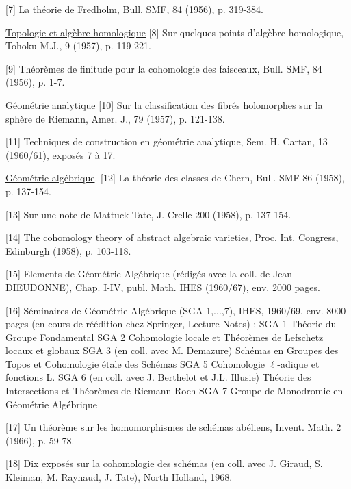 \documentclass[11pt]{article}
\newcommand{\scanpage}[1]{\par\bigskip\noindent{\small\sffamily[scan #1]}\par}
\newcommand{\mspage}[1]{{\small\sffamily[p.\,#1]}}
\newcommand{\hand}[1]{\textcolor{blue}{#1}}
\newcommand{\uline}[1]{\underline{#1}}
\begin{document}
[7] La théorie de Fredholm, Bull. SMF, 84 (1956),
p. 319-384.

\uline{Topologie et algèbre homologique}
[8] Sur quelques points d'algèbre homologique,
Tohoku M.J., 9 (1957), p. 119-221.

[9] Théorèmes de finitude pour la cohomologie des
faisceaux, Bull. SMF, 84 (1956), p. 1-7.

\uline{Géométrie analytique}
[10] Sur la classification des fibrés holomorphes
sur la sphère de Riemann, Amer. J., 79 (1957),
p. 121-138.

[11] Techniques de construction en géométrie analytique,
Sem. H. Cartan, 13 (1960/61), exposés 7 à 17.

\mspage{\hand{232}}

\clearpage
\scanpage{119/233}
\mspage{. 20 .}

\uline{Géométrie algébrique}.
[12] La théorie des classes de Chern, Bull. SMF 86
(1958), p. 137-154.

[13] Sur une note de Mattuck-Tate, J. Crelle 200
(1958), p. 137-154.

[14] The cohomology theory of abstract algebraic
varieties, Proc. Int. Congress, Edinburgh
(1958), p. 103-118.

[15] Elements de Géométrie Algébrique (rédigés avec
la coll. de Jean DIEUDONNE), Chap. I-IV, publ.
Math. IHES (1960/67), env. 2000 pages.

[16] Séminaires de Géométrie Algébrique (SGA 1,...,7),
IHES, 1960/69, env. 8000 pages (en cours de
réédition chez Springer, Lecture Notes) :
SGA 1 Théorie du Groupe Fondamental
SGA 2 Cohomologie locale et Théorèmes de Lefschetz
locaux et globaux
SGA 3 (en coll. avec M. Demazure) Schémas en
Groupes des Topos et Cohomologie étale
des Schémas
SGA 5 Cohomologie $\ell$-adique et fonctions L.
SGA 6 (en coll. avec J. Berthelot et J.L. Illusie)
Théorie des Intersections et Théorèmes de
Riemann-Roch
SGA 7 Groupe de Monodromie en Géométrie Algébrique

[17] Un théorème sur les homomorphismes de schémas
abéliens, Invent. Math. 2 (1966), p. 59-78.

[18] Dix exposés sur la cohomologie des schémas
(en coll. avec J. Giraud, S. Kleiman, M. Raynaud,
J. Tate), North Holland, 1968.
\end{document}
